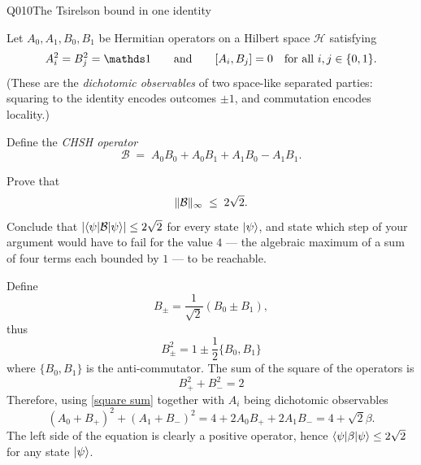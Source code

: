 \begin{entry}{Q010}{The Tsirelson bound in one identity}


\begin{problem}
Let $A_0,A_1,B_0,B_1$ be Hermitian operators on a Hilbert space $\mathcal H$ satisfying
\[
  A_i^{2}=B_j^{2}=\id
  \qquad\text{and}\qquad
  [A_i,B_j]=0 \quad\text{for all } i,j\in\{0,1\}.
\]
(These are the \emph{dichotomic observables} of two space-like separated parties: squaring
to the identity encodes outcomes $\pm 1$, and commutation encodes locality.)

Define the \emph{CHSH operator}
\[
  \mathcal{B} \;=\; A_0B_0+A_0B_1+A_1B_0-A_1B_1 .
\]

Prove that
\[
  \lVert\mathcal{B}\rVert_{\infty} \;\le\; 2\sqrt{2}.
\]
Conclude that $\lvert\langle \psi \vert \mathcal{B} \vert \psi \rangle\rvert\le 2\sqrt{2}$ for every state
$\lvert \psi \rangle$, and state which step of your argument would have to fail for the value $4$
--- the algebraic maximum of a sum of four terms each bounded by $1$ --- to be reachable.
\end{problem}


\begin{solution}
Define $$B_{\pm} = \frac{1}{\sqrt{2}}(B_0 \pm B_1),$$ thus $$B_{\pm}^2=1\pm\frac{1}{2} \{B_0,B_1\} $$ where  $\{B_0,B_1\}$ is the anti-commutator. The sum of the square of the operators is 
\begin{equation}
    B_{+}^2+B_{-}^2=2
    \label{square sum}
\end{equation}
Therefore, using \eqref{square sum} together with $A_i$ being dichotomic observables
\begin{equation}
    (A_0 + B_+)^2 +(A_1+B_-)^2= 4 + 2A_0B_+ + 2A_1B_- = 4 + \sqrt{2}\beta.
\end{equation}
The left side of the equation is clearly a positive operator, hence $\langle \psi \vert \beta \vert \psi \rangle \leq 2\sqrt{2}$ for any state $\lvert \psi \rangle$. 


\end{solution}
\end{entry}
